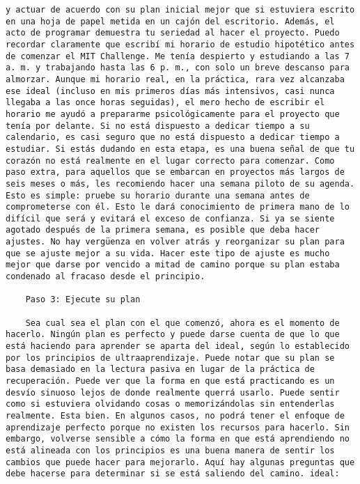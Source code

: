 \begin{verbatim}
y actuar de acuerdo con su plan inicial mejor que si estuviera escrito en una hoja de papel metida en un cajón del escritorio. Además, el acto de programar demuestra tu seriedad al hacer el proyecto. Puedo recordar claramente que escribí mi horario de estudio hipotético antes de comenzar el MIT Challenge. Me tenía despierto y estudiando a las 7 a. m. y trabajando hasta las 6 p. m., con solo un breve descanso para almorzar. Aunque mi horario real, en la práctica, rara vez alcanzaba ese ideal (incluso en mis primeros días más intensivos, casi nunca llegaba a las once horas seguidas), el mero hecho de escribir el horario me ayudó a prepararme psicológicamente para el proyecto que tenía por delante. Si no está dispuesto a dedicar tiempo a su calendario, es casi seguro que no está dispuesto a dedicar tiempo a estudiar. Si estás dudando en esta etapa, es una buena señal de que tu corazón no está realmente en el lugar correcto para comenzar. Como paso extra, para aquellos que se embarcan en proyectos más largos de seis meses o más, les recomiendo hacer una semana piloto de su agenda. Esto es simple: pruebe su horario durante una semana antes de comprometerse con él. Esto le dará conocimiento de primera mano de lo difícil que será y evitará el exceso de confianza. Si ya se siente agotado después de la primera semana, es posible que deba hacer ajustes. No hay vergüenza en volver atrás y reorganizar su plan para que se ajuste mejor a su vida. Hacer este tipo de ajuste es mucho mejor que darse por vencido a mitad de camino porque su plan estaba condenado al fracaso desde el principio.
	
	Paso 3: Ejecute su plan
	
	Sea cual sea el plan con el que comenzó, ahora es el momento de hacerlo. Ningún plan es perfecto y puede darse cuenta de que lo que está haciendo para aprender se aparta del ideal, según lo establecido por los principios de ultraaprendizaje. Puede notar que su plan se basa demasiado en la lectura pasiva en lugar de la práctica de recuperación. Puede ver que la forma en que está practicando es un desvío sinuoso lejos de donde realmente querrá usarlo. Puede sentir como si estuviera olvidando cosas o memorizándolas sin entenderlas realmente. Esta bien. En algunos casos, no podrá tener el enfoque de aprendizaje perfecto porque no existen los recursos para hacerlo. Sin embargo, volverse sensible a cómo la forma en que está aprendiendo no está alineada con los principios es una buena manera de sentir los cambios que puede hacer para mejorarlo. Aquí hay algunas preguntas que debe hacerse para determinar si se está saliendo del camino. ideal:
	

\end{verbatim}
